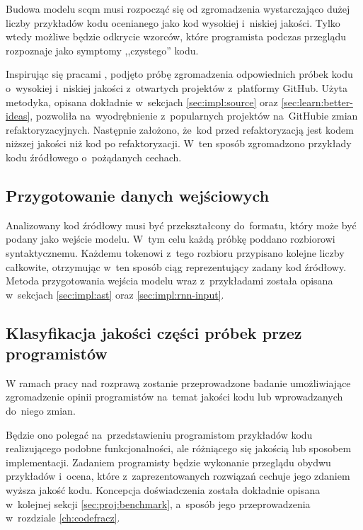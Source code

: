 \documentclass[twoside]{praca}
\begin{document}
Budowa modelu \gls{scqm} musi rozpocząć się od zgromadzenia wystarczająco dużej liczby przykładów kodu ocenianego jako kod wysokiej i~niskiej jakości. Tylko wtedy możliwe będzie odkrycie wzorców, które programista podczas przeglądu rozpoznaje jako symptomy ,,czystego'' kodu.

Inspirując się pracami \cite{ray2014large, shimagaki2016commits}, podjęto próbę zgromadzenia odpowiednich próbek kodu o~wysokiej i~niskiej jakości z~otwartych projektów z~platformy GitHub. Użyta metodyka, opisana dokładnie w~sekcjach \ref{sec:impl:source} oraz \ref{sec:learn:better-ideas}, pozwoliła na~wyodrębnienie z~popularnych projektów na~GitHubie zmian refaktoryzacyjnych. Następnie założono, że~kod przed refaktoryzacją jest kodem niższej jakości niż kod po refaktoryzacji. W~ten sposób zgromadzono przykłady kodu źródłowego o~pożądanych cechach.

\subsection{Przygotowanie danych wejściowych}

Analizowany kod źródłowy musi być przekształcony do~formatu, który może być podany jako wejście modelu. W~tym celu każdą próbkę poddano rozbiorowi syntaktycznemu. Każdemu tokenowi z~tego rozbioru przypisano kolejne liczby całkowite, otrzymując w~ten sposób ciąg reprezentujący zadany kod źródłowy. Metoda przygotowania wejścia modelu wraz z~przykładami została opisana w~sekcjach \ref{sec:impl:ast} oraz \ref{sec:impl:rnn-input}.

\subsection{Klasyfikacja jakości części próbek przez programistów}
W ramach pracy nad rozprawą zostanie przeprowadzone badanie umożliwiające zgromadzenie opinii programistów na~temat jakości kodu lub wprowadzanych do~niego zmian.

Będzie ono polegać na~przedstawieniu programistom przykładów kodu realizującego podobne funkcjonalności, ale różniącego się jakością lub sposobem implementacji. Zadaniem programisty będzie wykonanie przeglądu obydwu przykładów i~ocena, które z~zaprezentowanych rozwiązań cechuje jego zdaniem wyższa jakość kodu. Koncepcja doświadczenia została dokładnie opisana w~kolejnej sekcji \ref{sec:proj:benchmark}, a~sposób jego przeprowadzenia w~rozdziale \ref{ch:codefracz}. 
\end{document}
